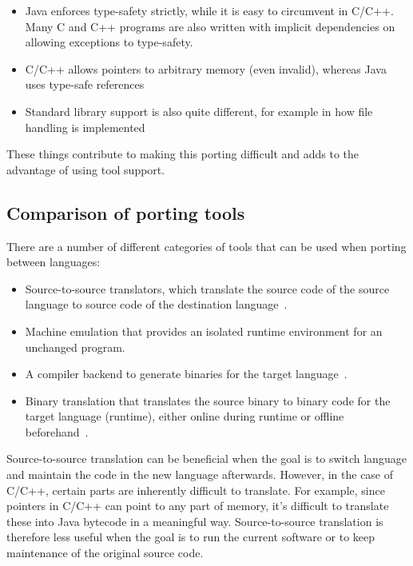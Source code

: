 \begin{itemize}
\item Java enforces type-safety strictly, while it is easy to circumvent in
  C/C++. Many C and C++ programs are also written with implicit dependencies
  on allowing exceptions to type-safety.
\item C/C++ allows pointers to arbitrary memory (even invalid), whereas Java
  uses type-safe references
\item Standard library support is also quite different, for example in how
  file handling is implemented
\end{itemize}

These things contribute to making this porting difficult and adds to the
advantage of using tool support.

\subsection{Comparison of porting tools}
There are a number of different categories of tools that can be used when
porting between languages:

\begin{itemize}
\item Source-to-source translators, which translate the source code of the
  source language to source code of the destination
  language~\cite{martin02ephedra, jazillan}.
\item Machine emulation that provides an isolated runtime environment for an
  unchanged program.
\item A compiler backend to generate binaries for the target
  language~\cite{axiomsol, cifuentes00UAB}.
\item Binary translation that translates the source binary to binary code for
  the target language (runtime), either online during runtime or offline
  beforehand~\cite{hookway97fx32, bellard05qemu, alliet04nestedvm}.
\end{itemize}

Source-to-source translation can be beneficial when the goal is to switch
language and maintain the code in the new language afterwards. However, in the
case of C/C++, certain parts are inherently difficult to translate. For
example, since pointers in C/C++ can point to any part of memory, it's
difficult to translate these into Java bytecode in a meaningful way.
Source-to-source translation is therefore less useful when the goal is to run
the current software or to keep maintenance of the original source code.

